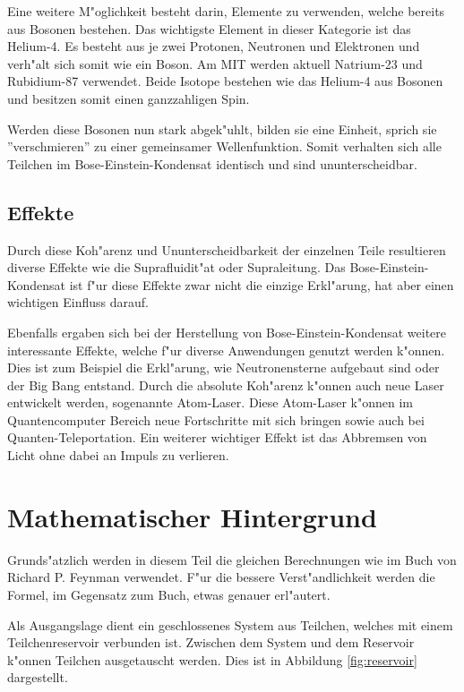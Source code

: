 \begin{refsection}
Eine weitere M"oglichkeit besteht darin, Elemente zu verwenden, welche bereits aus Bosonen bestehen. Das wichtigste Element in dieser Kategorie ist das Helium-4. Es besteht aus je zwei Protonen, Neutronen und Elektronen und verh"alt sich somit wie ein Boson. Am MIT werden aktuell Natrium-23 und Rubidium-87 verwendet. Beide Isotope bestehen wie das Helium-4 aus Bosonen und besitzen somit einen ganzzahligen Spin.

Werden diese Bosonen nun stark abgek"uhlt, bilden sie eine Einheit, sprich sie ''verschmieren'' zu einer gemeinsamer Wellenfunktion. Somit verhalten sich alle Teilchen im Bose-Einstein-Kondensat identisch und sind ununterscheidbar.

\subsection{Effekte}

Durch diese Koh"arenz und Ununterscheidbarkeit der einzelnen Teile resultieren diverse Effekte wie die Suprafluidit"at oder Supraleitung. Das Bose-Einstein-Kondensat ist f"ur diese Effekte zwar nicht die einzige Erkl"arung, hat aber einen wichtigen Einfluss darauf. 

Ebenfalls ergaben sich bei der Herstellung von Bose-Einstein-Kondensat weitere interessante Effekte, welche f"ur diverse Anwendungen genutzt werden k"onnen. Dies ist zum Beispiel die Erkl"arung, wie Neutronensterne aufgebaut sind oder der Big Bang entstand. Durch die absolute Koh"arenz k"onnen auch neue Laser entwickelt werden, sogenannte Atom-Laser. Diese Atom-Laser k"onnen im Quantencomputer Bereich neue Fortschritte mit sich bringen sowie auch bei Quanten-Teleportation. Ein weiterer wichtiger Effekt ist das Abbremsen von Licht ohne dabei an Impuls zu verlieren.


\section{Mathematischer Hintergrund}

Grunds"atzlich werden in diesem Teil die gleichen Berechnungen wie im Buch von Richard P. Feynman \cite{bose:feynman} verwendet. F"ur die bessere Verst"andlichkeit werden die Formel, im Gegensatz zum Buch, etwas genauer erl"autert.

Als Ausgangslage dient ein geschlossenes System aus Teilchen, welches mit einem Teilchenreservoir verbunden ist. 
Zwischen dem System und dem Reservoir k"onnen Teilchen ausgetauscht werden. Dies ist in Abbildung \ref{fig:reservoir} dargestellt.


\end{refsection}
